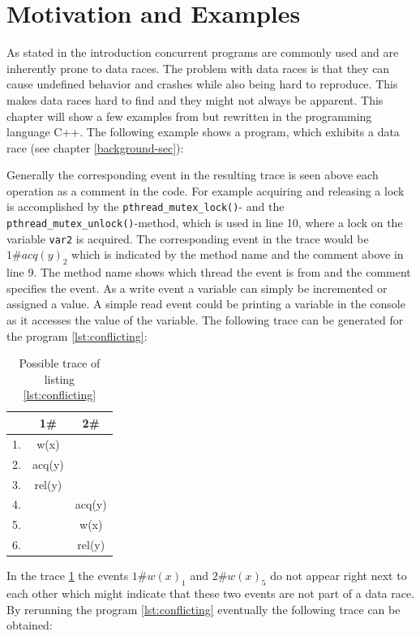\documentclass[12pt]{article}
\begin{document}
	\section{Motivation and Examples}
	As stated in the introduction concurrent programs are commonly used and are inherently prone to data races. The problem with data races is that they can cause undefined behavior and crashes while also being hard to reproduce. This makes data races hard to find and they might not always be apparent. This chapter will show a few examples from \cite{sulzmann2} but rewritten in the programming language C++. The following example shows a program, which exhibits a data race (see chapter \ref{background-sec}):
	
	Generally the corresponding event in the resulting trace is seen above each operation as a comment in the code. For example acquiring and releasing a lock is accomplished by the \texttt{pthread\_mutex\_lock()}- and the \texttt{pthread\_mutex\_unlock()}-method, which is used in line 10, where a lock on the variable \texttt{var2} is acquired. The corresponding event in the trace would be $1\#acq(y)_2$ which is indicated by the method name and the comment above in line 9. The method name shows which thread the event is from and the comment specifies the event. As a write event a variable can simply be incremented or assigned a value. A simple read event could be printing a variable in the console as it accesses the value of the variable. The following trace can be generated for the program \ref{lst:conflicting}:
	\begin{table}[H]
		\begin{center}
			\begin{tabular}{ c c c}
				& 1\# & 2\# \\
				\hline
				1. & w(x) & \\
				2. & acq(y) & \\
				3. & rel(y) & \\
				4. & & acq(y) \\
				5. & & w(x) \\
				6. & & rel(y) \\
			\end{tabular}
			\caption{Possible trace of listing \ref{lst:conflicting}}
			\label{trace1}
		\end{center}
	\end{table}
	In the trace \ref{trace1} the events $1\#w(x)_1$ and $2\#w(x)_5$ do not appear right next to each other which might indicate that these two events are not part of a data race. By rerunning the program \ref{lst:conflicting} eventually the following trace can be obtained:
\end{document}
